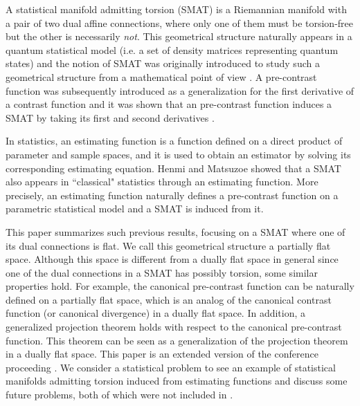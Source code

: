 \documentclass[graybox]{svmult}
\begin{document}
A statistical manifold admitting torsion (SMAT) is a Riemannian manifold with a pair of
two dual affine connections, where only one of them must be torsion-free but the other
is necessarily {\it not}. This geometrical structure naturally appears in a quantum
statistical model (i.e. a set of density matrices representing quantum states) \cite{AN}
and the notion of SMAT was originally introduced to study such a geometrical structure 
from a mathematical point of view \cite{Ku2}. A pre-contrast function was subsequently
introduced as a generalization for the first derivative of a contrast function and it was
shown that an pre-contrast function induces a SMAT by taking its first and second
derivatives \cite{Ma2}.

In statistics, an estimating function is a function defined on a direct product of
parameter and sample spaces, and it is used to obtain an estimator by solving its 
corresponding estimating equation.
Henmi and Matsuzoe \cite{HM} showed that a SMAT also appears in ``classical"
statistics through an estimating function. More precisely, an estimating function
naturally defines a pre-contrast function on a parametric statistical model and a
SMAT is induced from it.

This paper summarizes such previous results, focusing on a SMAT where one
of its dual connections is flat. We call this geometrical structure a partially flat space.
Although this space is different from a dually flat space in general since one of the
dual connections in a SMAT has possibly torsion, some similar properties hold.
For example, the canonical pre-contrast function can be naturally defined on a
partially flat space, which is an analog of the canonical contrast function (or canonical
divergence) in a dually flat space. In addition, a generalized projection theorem holds
with respect to the canonical pre-contrast function. This theorem can be seen as a
generalization of the projection theorem in a dually flat space.
This paper is an extended version of the conference proceeding \cite{He}.
We consider a statistical problem to see an example of statistical manifolds admitting
torsion induced from estimating functions and discuss some future problems, both of
which were not included in \cite{He}.

\end{document}
